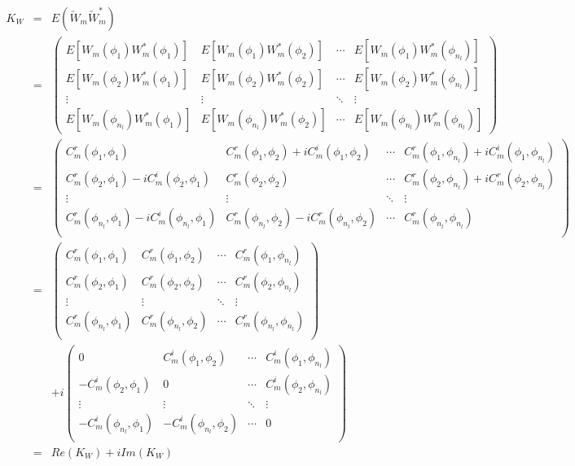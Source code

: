 	\begin{eqnarray*}
		K_W & = & E(\utilde{W}_m\utilde{W}_m^*) \\
		& = &\left(\begin{array}{cccc}
		E[W_m(\phi_1) W_m^*(\phi_1) ] & E[W_m(\phi_1) W_m^*(\phi_2) ]  & \cdots & E[W_m(\phi_1) W_m^*(\phi_{n_l}) ]\\
		E[W_m(\phi_2) W_m^*(\phi_1) ] & E[W_m(\phi_2) W_m^*(\phi_2) ]  & \cdots & E[W_m(\phi_2) W_m^*(\phi_{n_l}) ]\\
		\vdots & \vdots  & \ddots & \vdots \\
		E[W_m(\phi_{n_l}) W_m^*(\phi_1) ] & E[W_m(\phi_{n_l}) W_m^*(\phi_2) ]  & \cdots & E[W_m(\phi_{n_l}) W_m^*(\phi_{n_l})]
		\end{array}
		\right)\\
		& = &\left(\begin{array}{cccc}
		C_m^r(\phi_1, \phi_1) & C_m^r(\phi_1, \phi_2)+iC_m^i(\phi_1, \phi_2) & \cdots & C_m^r(\phi_1, \phi_{n_l})+iC_m^i(\phi_1, \phi_{n_l})\\
		C_m^r(\phi_2, \phi_1)-iC_m^i(\phi_2, \phi_1) & C_m^r(\phi_2, \phi_2) & \cdots & C_m^r(\phi_2, \phi_{n_l})+iC_m^r(\phi_2, \phi_{n_l})\\
		\vdots & \vdots  & \ddots & \vdots \\
		C_m^r(\phi_{n_l}, \phi_1)-iC_m^i(\phi_{n_l}, \phi_1) & C_m^r(\phi_{n_l}, \phi_2)-iC_m^r(\phi_{n_l}, \phi_2) & \cdots & C_m^r(\phi_{n_l}, \phi_{n_l})\\
		\end{array}
		\right) \\
		& = &\left(\begin{array}{cccc}
		C_m^r(\phi_1, \phi_1) & C_m^r(\phi_1, \phi_2) & \cdots & C_m^r(\phi_1, \phi_{n_l})\\
		C_m^r(\phi_2, \phi_1) & C_m^r(\phi_2, \phi_2) & \cdots & C_m^r(\phi_2, \phi_{n_l})\\
		\vdots & \vdots  & \ddots & \vdots \\
		C_m^r(\phi_{n_l}, \phi_1) & C_m^r(\phi_{n_l}, \phi_2) & \cdots & C_m^r(\phi_{n_l}, \phi_{n_l})\\
		\end{array}
		\right) \\
		& & + i
		\left(\begin{array}{cccc}
		0 & C_m^i(\phi_1, \phi_2) & \cdots & C_m^i(\phi_1, \phi_{n_l})\\
		-C_m^i(\phi_2, \phi_1) & 0 & \cdots & C_m^i(\phi_2, \phi_{n_l})\\
		\vdots & \vdots  & \ddots & \vdots \\
		-C_m^i(\phi_{n_l}, \phi_1) & -C_m^i(\phi_{n_l}, \phi_2) & \cdots & 0\\
		\end{array}
		\right)\\
		&=& Re(K_W) + iIm(K_W) \\
	\end{eqnarray*}
		
